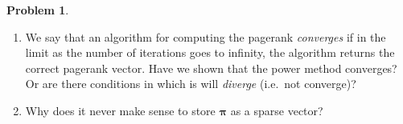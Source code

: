 \documentclass[10pt]{article}
\theoremstyle{definition}
\newtheorem{problem}{Problem}
\newcommand{\pr}{\bm \pi}
\begin{document}
\begin{problem}
\begin{enumerate}
        \item
            We say that an algorithm for computing the pagerank \emph{converges} if in the limit as the number of iterations goes to infinity, the algorithm returns the correct pagerank vector.
            Have we shown that the power method converges?
            Or are there conditions in which is will \emph{diverge} (i.e.\ not converge)?
            \vspace{2in}

        \item
            Why does it never make sense to store $\pr$ as a sparse vector?
            \vspace{2in}

    \end{enumerate}
\end{problem}

\end{document}

